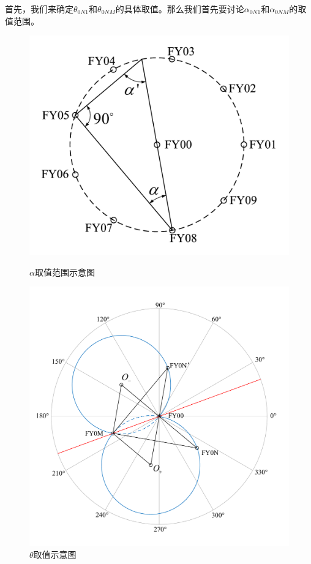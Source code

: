 \documentclass[12pt,AutoFakeSlant,AutoFakeBold]{article}
\begin{document}
首先，我们来确定$\theta_{0N1}$和$\theta_{0NM}$的具体取值。那么我们首先要讨论$\alpha_{0N1}$和$\alpha_{0NM}$的取值范围。

\begin{figure}[!ht]
    \centering
    \begin{minipage}[t]{0.48\textwidth}
        \centering
        \includegraphics[width=\textwidth]{图片/角度范围示意图.pdf}
        \caption{$\alpha$取值范围示意图}
        \label{fig:角度范围示意图}
    \end{minipage}
    \begin{minipage}[t]{0.48\textwidth}
        \centering
        \includegraphics[width=\textwidth]{图片/theta取值讨论.pdf}
        \caption{$\theta$取值示意图}
        \label{fig:正负取值示意图}
    \end{minipage}
\end{figure}
\end{document}
